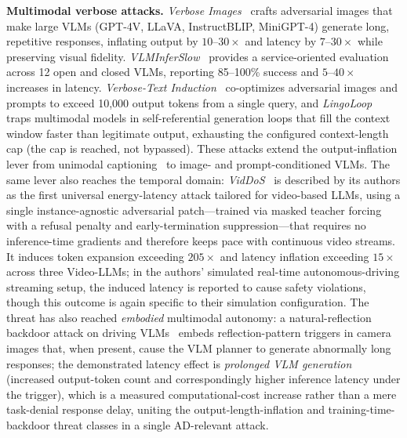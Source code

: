 \documentclass[acmsmall,screen,review,nonacm]{acmart}
\begin{document}
\noindent\textbf{Multimodal verbose attacks.}
\emph{Verbose Images}~\cite{gao2024verbose} crafts adversarial images that make large VLMs (GPT-4V, LLaVA, InstructBLIP, MiniGPT-4) generate long, repetitive responses, inflating output by $10$--$30\times$ and latency by $7$--$30\times$ while preserving visual fidelity. \emph{VLMInferSlow}~\cite{wang2025vlminferslow} provides a service-oriented evaluation across 12 open and closed VLMs, reporting 85--100\% success and $5$--$40\times$ increases in latency. \emph{Verbose-Text Induction}~\cite{luo2025verbosetext} co-optimizes adversarial images and prompts to exceed 10{,}000 output tokens from a single query, and \emph{LingoLoop}~\cite{fu2025lingoloop} traps multimodal models in self-referential generation loops that fill the context window faster than legitimate output, exhausting the configured context-length cap (the cap is reached, not bypassed). These attacks extend the output-inflation lever from unimodal captioning~\cite{chen2022nicgslowdown} to image- and prompt-conditioned VLMs. The same lever also reaches the temporal domain: \emph{VidDoS}~\cite{tang2026viddos} is described by its authors as the first universal energy-latency attack tailored for video-based LLMs, using a single instance-agnostic adversarial patch---trained via masked teacher forcing with a refusal penalty and early-termination suppression---that requires no inference-time gradients and therefore keeps pace with continuous video streams. It induces token expansion exceeding $205\times$ and latency inflation exceeding $15\times$ across three Video-LLMs; in the authors' simulated real-time autonomous-driving streaming setup, the induced latency is reported to cause safety violations, though this outcome is again specific to their simulation configuration. The threat has also reached \emph{embodied} multimodal autonomy: a natural-reflection backdoor attack on driving VLMs~\cite{liu2025vlmbackdoor} embeds reflection-pattern triggers in camera images that, when present, cause the VLM planner to generate abnormally long responses; the demonstrated latency effect is \emph{prolonged VLM generation} (increased output-token count and correspondingly higher inference latency under the trigger), which is a measured computational-cost increase rather than a mere task-denial response delay, uniting the output-length-inflation and training-time-backdoor threat classes in a single AD-relevant attack.
\end{document}
